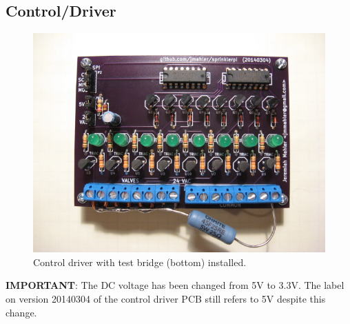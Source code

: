 \documentclass{article}
\begin{document}
\clearpage
\subsection{Control/Driver}

\begin{figure}[htbp!]
\begin{center}
\includegraphics[scale=0.6]{img/control_driver_tb_02.jpg}
\end{center}
\caption{Control driver with test bridge (bottom) installed.}
\label{fig:cdbridge}
\end{figure}

\begin{framed}
\textbf{IMPORTANT}: The DC voltage has been changed
from 5V to 3.3V.
The label on version 20140304 of the control driver PCB still
refers to 5V despite this change.
\end{framed}
\end{document}
